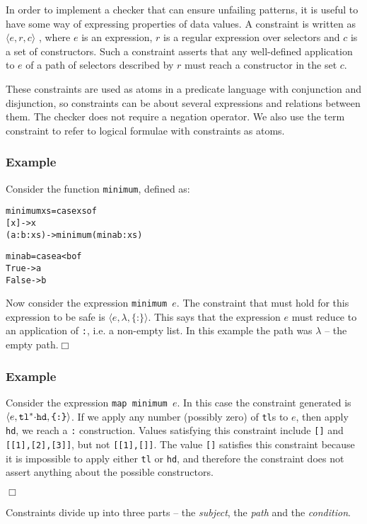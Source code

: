 \documentclass[preprint]{sigplanconf}
\newcommand{\T}[1]{\texttt{#1}}
\newcommand{\tup}[1]{\ensuremath{\langle #1 \rangle}}
\newcounter{exmp}
\newcommand{\yesexample}{\subsubsection*{Example \arabic{exmp}}\addtocounter{exmp}{1}}
\newcommand{\noexample}{\hfill$\Box$}
\newenvironment{code}{\begin{alltt}\small}{\end{alltt}}
\newcommand{\K}{\ensuremath{^\ast}} %
\newcommand{\D}{\ensuremath{\cdot}} %
\renewcommand{\c}[3]{\tup{\T{#1},\T{#2},\T{\{#3\}}}}
\newcommand{\cc}[2]{\c{#1}{$\lambda$}{#2}}
\begin{document}
In order to implement a checker that can ensure unfailing patterns,
it is useful to have some way of expressing properties of data
values. A constraint is written as $\tup{e,r,c}$ , where $e$ is an
expression, $r$ is a regular expression over selectors and $c$ is a
set of constructors. Such a constraint asserts that any well-defined
application to $e$ of a path of selectors described by $r$ must
reach a constructor in the set $c$.

These constraints are used as atoms in a predicate language with
conjunction and disjunction, so constraints can be about several
expressions and relations between them. The checker does not require
a negation operator. We also use the term constraint to refer to
logical formulae with constraints as atoms.

\yesexample

Consider the function \T{minimum}, defined as:

\begin{code}
minimum xs = case xs of
                  [x]      -> x
                  (a:b:xs) -> minimum (min a b : xs)

min a b = case a < b of
               True  -> a
               False -> b
\end{code}

Now consider the expression \T{minimum $e$}. The constraint that
must hold for this expression to be safe is \cc{$e$}{:}. This says
that the expression $e$ must reduce to an application of \T{:}, i.e.
a non-empty list. In this example the path was $\lambda$ -- the
empty path.\noexample

\yesexample

Consider the expression \T{map minimum $e$}. In this case the
constraint generated is \c{$e$}{tl\K\D hd}{:}. If we apply any
number (possibly zero) of \T{tl}s to $e$, then apply \T{hd}, we
reach a \T{:} construction. Values satisfying this constraint
include \T{[]} and \T{[[1],[2],[3]]}, but not \T{[[1],[]]}. The
value \T{[]} satisfies this constraint because it is impossible to
apply either \T{tl} or \T{hd}, and therefore the constraint does not
assert anything about the possible constructors.

\noexample

Constraints divide up into three parts -- the \textit{subject}, the
\textit{path} and the \textit{condition}.
\end{document}
